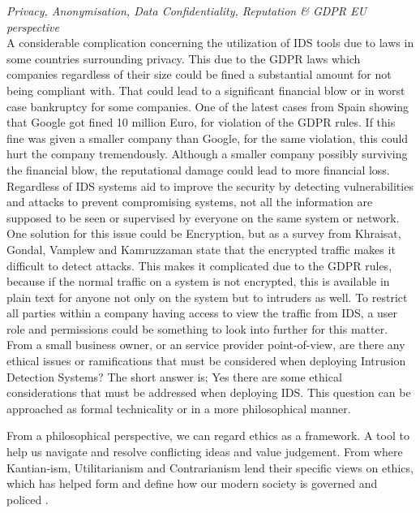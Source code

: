 \textit{Privacy, Anonymisation, Data Confidentiality, Reputation \& GDPR EU perspective}\\

A considerable complication concerning the utilization of IDS tools due to laws in some countries surrounding privacy. This due to the GDPR laws which companies regardless of their size could be fined a substantial amount for not being compliant with. That could lead to a significant financial blow or in worst case bankruptcy for some companies. One of the latest cases from Spain showing that Google got fined 10 million Euro, for violation of the GDPR rules.\cite{Enforcementtracker.com} If this fine was given a smaller company than Google, for the same violation, this could hurt the company tremendously. Although a smaller company possibly surviving the financial blow, the reputational damage could lead to more financial loss.\\

Regardless of IDS systems aid to improve the security by detecting vulnerabilities and attacks to prevent compromising systems, not all the information are supposed to be seen or supervised by everyone on the same system or network. One solution for this issue could be Encryption, but as a survey from Khraisat, Gondal, Vamplew and Kamruzzaman state that the encrypted traffic makes it difficult to detect attacks. \cite{Khraisat2019} This makes it complicated due to the GDPR rules, because if the normal traffic on a system is not encrypted, this is available in plain text for anyone not only on the system but to intruders as well. To restrict all parties within a company having access to view the traffic from IDS, a user role and permissions could be something to look into further for this matter.\\


From a small business owner, or an service provider point-of-view, are there any ethical issues or ramifications that must be considered when deploying Intrusion Detection Systems? The short answer is; Yes there are some ethical considerations that must be addressed when deploying IDS. This question can be approached as formal technicality or in a more philosophical manner.

From a philosophical perspective, we can regard ethics as a framework. A tool to help us navigate and resolve conflicting ideas and value judgement. From where Kantian-ism, Utilitarianism and Contrarianism lend their specific views on ethics, which has helped form and define how our modern society is governed and policed \cite{Courtland2017}.

